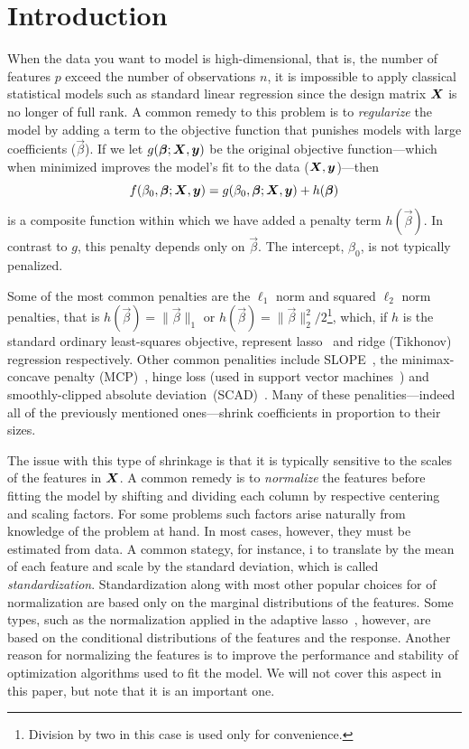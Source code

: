 \section{Introduction}

When the data you want to model is high-dimensional, that is, the number of features \(p\)
exceed the number of observations \(n\), it is impossible to apply classical statistical
models such as standard linear regression since the design matrix \(\boldsymbol X\) is no longer
of full rank. A common remedy to this problem is to \emph{regularize} the model by adding a
term to the objective function that punishes models with large coefficients
(\(\vec\beta\)). If we let \(g(\boldsymbol\beta; \boldsymbol X, \boldsymbol y)\) be the original objective
function---which when minimized improves the model's fit to the data (\(\boldsymbol X, \boldsymbol
y\))---then
\[
  f(\beta_0, \boldsymbol\beta; \boldsymbol X, \boldsymbol y) = g(\beta_0, \boldsymbol\beta; \boldsymbol X, \boldsymbol y) + h(\boldsymbol\beta)
\]
is a composite function within which we have added a penalty term \(h(\vec\beta)\). In
contrast to \(g\), this penalty depends only on \(\vec{\beta}\). The intercept,
\(\beta_0\), is not typically penalized.

Some of the most common penalties are the \(\ell_1\) norm and squared \(\ell_2\) norm
penalties, that is \(h(\vec\beta) = \lVert \vec\beta \rVert_1\) or \(h(\vec\beta) = \lVert
\vec\beta \rVert_2^2/2\)\footnote{Division by two in this case is used only for
  convenience.}, which, if \(h\) is the standard ordinary least-squares objective, represent
lasso~\citep{tibshirani1996,santosa1986,donoho1994} and ridge (Tikhonov) regression
respectively. Other common penalities include SLOPE~\citep{bogdan2013,bogdan2015}, the
minimax-concave penalty (MCP)~\citep{zhang2010}, hinge loss (used in support vector
machines~\citep{cortes1995}) and smoothly-clipped absolute
deviation~(SCAD)~\citep{fan2001}. Many of these penalities---indeed all of the previously
mentioned ones---shrink coefficients in proportion to their sizes.

The issue with this type of shrinkage is that it is typically sensitive to the scales of
the features in \(\boldsymbol X\). A common remedy is to \emph{normalize} the features before
fitting the model by shifting and dividing each column by respective centering and scaling
factors. For some problems such factors arise naturally from knowledge of the problem at
hand. In most cases, however, they must be estimated from data. A common stategy, for
instance, i to translate by the mean of each feature and scale by the standard deviation,
which is called \emph{standardization}. Standardization along with most other popular
choices for of normalization are based only on the marginal distributions of the features.
Some types, such as the normalization applied in the adaptive lasso~\citep{zou2006},
however, are based on the conditional distributions of the features and the response.
Another reason for normalizing the features is to improve the performance and stability of
optimization algorithms used to fit the model. We will not cover this aspect in this paper,
but note that it is an important one.

